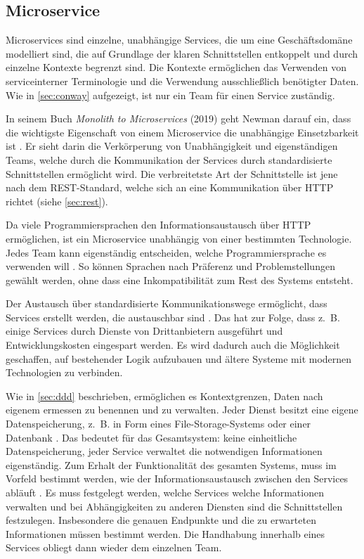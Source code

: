 \subsection{Microservice}

Microservices sind einzelne, unabhängige Services, die um eine Geschäftsdomäne modelliert sind, die auf Grundlage der klaren Schnittstellen entkoppelt und durch einzelne Kontexte begrenzt sind. Die Kontexte ermöglichen das Verwenden von serviceinterner Terminologie und die Verwendung ausschließlich benötigter Daten. Wie in \cref{sec:conway} aufgezeigt, ist nur ein Team für einen Service zuständig.

In seinem Buch \textit{Monolith to Microservices} (2019) geht Newman darauf ein, dass die wichtigste Eigenschaft von einem Microservice die unabhängige Einsetzbarkeit ist \parencite[vgl.][Kap. 2.1.1]{newman_monolith_2019}. Er sieht darin die Verkörperung von Unabhängigkeit und eigenständigen Teams, welche durch die Kommunikation der Services durch standardisierte Schnittstellen ermöglicht wird. Die verbreitetste Art der Schnittstelle ist jene nach dem REST-Standard, welche sich an eine Kommunikation über HTTP richtet (siehe \cref{sec:rest}).
 
Da viele Programmiersprachen den Informationsaustausch über HTTP ermöglichen, ist ein Microservice unabhängig von einer bestimmten Technologie. Jedes Team kann eigenständig entscheiden, welche Programmiersprache es verwenden will \parencite[vgl.][Kap. 1.2]{wolff_microservices_2018}. So können Sprachen nach Präferenz und Problemstellungen gewählt werden, ohne dass eine Inkompatibilität zum Rest des Systems entsteht.

Der Austausch über standardisierte Kommunikationswege ermöglicht, dass Services erstellt werden, die austauschbar sind \parencite[vgl.][Kap. 1.2]{wolff_microservices_2018}. Das hat zur Folge, dass z.~B. einige Services durch Dienste von Drittanbietern ausgeführt und Entwicklungskosten eingespart werden. Es wird dadurch auch die Möglichkeit geschaffen, auf bestehender Logik aufzubauen und ältere Systeme mit modernen Technologien zu verbinden.

Wie in \cref{sec:ddd} beschrieben, ermöglichen es Kontextgrenzen, Daten nach eigenem ermessen zu benennen und zu verwalten. Jeder Dienst besitzt eine eigene Datenspeicherung, z.~B. in Form eines File-Storage-Systems oder einer Datenbank \parencite[vgl.][Kap. 2.1.3]{newman_monolith_2019}. Das bedeutet für das Gesamtsystem: keine einheitliche Datenspeicherung, jeder Service verwaltet die notwendigen Informationen eigenständig. Zum Erhalt der Funktionalität des gesamten Systems, muss im Vorfeld bestimmt werden, wie der Informationsaustausch zwischen den Services abläuft \parencite[vgl.][Kap. 4.1]{wolff_microservices_2018}. Es muss festgelegt werden, welche Services welche Informationen verwalten und bei Abhängigkeiten zu anderen Diensten sind die Schnittstellen festzulegen. Insbesondere die genauen Endpunkte und die zu erwarteten Informationen müssen bestimmt werden. Die Handhabung innerhalb eines Services obliegt dann wieder dem einzelnen Team. 

